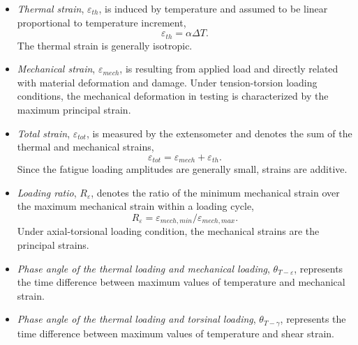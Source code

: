 \begin{itemize}
  \item {\em Thermal strain}, $\varepsilon_{th}$, is induced by temperature and assumed to be linear proportional to temperature increment, 
  \begin{equation}
  \varepsilon_{th}=\alpha\Delta T.
  \label{Equ:thermal_strain}
  \end{equation} 
  The thermal strain is generally isotropic.
  \item {\em Mechanical strain}, $\varepsilon_{mech}$, is resulting from applied load and directly related with material deformation and damage. Under tension-torsion loading conditions, the mechanical deformation in testing is characterized by the maximum principal strain.
  \item {\em Total strain}, $\varepsilon_{tot}$, is measured by the extensometer and denotes the sum of the thermal and mechanical strains, 
  \begin{equation}
  \varepsilon_{tot}=\varepsilon_{mech}+\varepsilon_{th}.
  \label{Equ:total_strain}
  \end{equation}
  Since the fatigue loading amplitudes are generally small, strains are additive.
  \item {\em Loading ratio}, $R_{\varepsilon}$, denotes the ratio of the minimum mechanical strain over the maximum mechanical strain within a loading cycle,
  \begin{equation}
  R_{\varepsilon}=\varepsilon_{mech,min}/\varepsilon_{mech,max}.
  \end{equation}
  Under axial-torsional loading condition, the mechanical strains are the principal strains.
  \item {\em Phase angle of the thermal loading and mechanical loading}, $\theta_{T-\varepsilon}$, represents the time difference between maximum values of temperature and mechanical strain.
  \item {\em Phase angle of the thermal loading and torsinal loading}, $\theta_{T-\gamma}$, represents the time difference between maximum values of temperature and shear strain.

\end{itemize}
